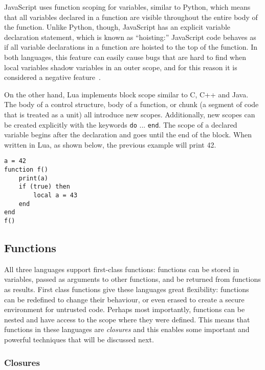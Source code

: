 JavaScript uses function scoping for variables, similar to Python, which means that all 
variables declared in a function are visible throughout the entire body of the function.
Unlike Python, though, JavaScript has an explicit variable declaration statement, which is known as ``hoisting:'' JavaScript code behaves as if all 
variable declarations in a function are hoisted to the top of the function. In both
languages, this feature can easily cause bugs that are hard to find when local variables
shadow variables in an outer scope, and for this reason it is considered a negative 
feature~\cite{goodparts}.

On the other hand, Lua implements block scope similar to C, C++ and Java.
The body of a control structure, body of a function, or chunk (a segment of
code that is treated as a unit) all introduce new scopes. Additionally,
new scopes can be created explicitly with the keywords \texttt{do} ... \texttt{end}.
The scope of a declared variable begins after the declaration and goes until the
end of the block. When written in Lua, as shown below, the previous example
will print 42. 

\begin{lstlisting}[language={[5.2]Lua},caption=A demonstration of block scope in Lua]
a = 42
function f()
	print(a)
    if (true) then
        local a = 43
    end
end
f()
\end{lstlisting}

\subsection{Functions}
\label{functions}

All three languages support first-class functions: functions can be stored
in variables, passed as arguments to other functions, and be returned
from functions as results. First class functions give these languages
great flexibility: functions can be redefined to change their behaviour,
or even erased to create a secure environment for untrusted code. Perhaps
most importantly, functions can be nested and have access to the scope where
they were defined. This means that functions in these languages are \emph{closures}
and this enables some important and powerful techniques that will be discussed next.

\subsubsection{Closures}
\label{closures}

